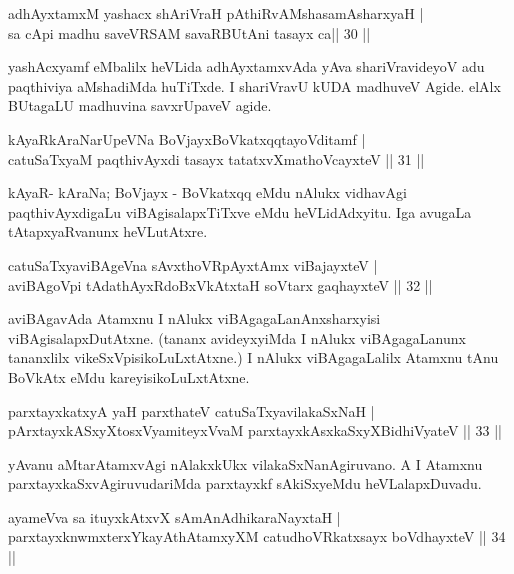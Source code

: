 \begin{shl}
adhAyxtamxM yashacx shAriVraH pAthiRvAMshasamAsharxyaH |\\
sa cApi madhu saveVRSAM savaRBUtAni tasayx ca\hfill  || 30 || 
\end{shl}
\begin{artha}
yashAcxyamf eMbalilx heVLida adhAyxtamxvAda yAva shariVravideyoV adu paqthiviya aMshadiMda huTiTxde. I shariVravU kUDA madhuveV Agide. elAlx BUtagaLU madhuvina savxrUpaveV agide. 
\end{artha}
\begin{shl}
kAyaRkAraNarUpeVNa BoVjayxBoVkatxqqtayoVditamf |\\
catuSaTxyaM paqthivAyxdi tasayx tatatxvXmathoVcayxteV \hfill || 31 || 
\end{shl}
\begin{artha}
kAyaR- kAraNa; BoVjayx - BoVkatxqq eMdu nAlukx vidhavAgi paqthivAyxdigaLu viBAgisalapxTiTxve eMdu heVLidAdxyitu. Iga avugaLa tAtapxyaRvanunx heVLutAtxre.
\end{artha}
\begin{shl}
catuSaTxyaviBAgeVna sAvxthoVR\s pAyxtAmx viBajayxteV |\\
aviBAgoV\s pi tAdathAyxRdoBxVkAtx\s taH soV\s tarx gaqhayxteV \hfill || 32 ||
\end{shl}
\begin{artha}
aviBAgavAda Atamxnu I nAlukx viBAgagaLanAnxsharxyisi viBAgisalapxDutAtxne. (tananx avideyxyiMda I nAlukx viBAgagaLanunx tananxlilx vikeSxVpisikoLuLxtAtxne.) I nAlukx viBAgagaLalilx Atamxnu tAnu BoVkAtx eMdu kareyisikoLuLxtAtxne.
\end{artha}

\begin{shl}
parxtayxkatxyA yaH parxthateV \footnotemark[1]catuSaTxyavilakaSxNaH |\\
pArxtayxkASxyXtosxV\s yamiteyxVvaM parxtayxkAsxkaSxyXBidhiVyateV \hfill || 33 ||
\end{shl}

\begin{artha}
yAvanu aMtarAtamxvAgi nAlakxkUkx vilakaSxNanAgiruvano. A I Atamxnu parxtayxkaSxvAgiruvudariMda parxtayxkf sAkiSxyeMdu heVLalapxDuvadu.
\end{artha}

\begin{shl}
ayameVva sa ituyxkAtxvX \footnotemark[2]sAmAnAdhikaraNayxtaH |\\
parxtayxknwmxterxYkayAthAtamxyXM catudhoVRkatxsayx boVdhayxteV \hfill || 34 ||
\end{shl}

